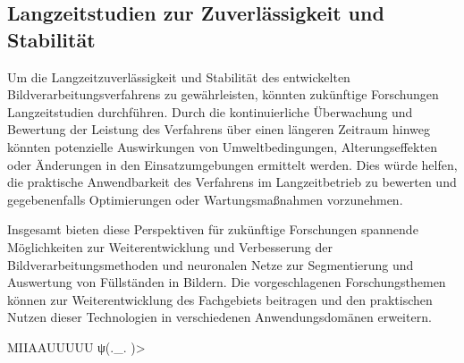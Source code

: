 \subsection{Langzeitstudien zur Zuverlässigkeit und Stabilität}

Um die Langzeitzuverlässigkeit und Stabilität des entwickelten Bildverarbeitungsverfahrens zu gewährleisten, könnten zukünftige Forschungen Langzeitstudien durchführen. Durch die kontinuierliche Überwachung und Bewertung der Leistung des Verfahrens über einen längeren Zeitraum hinweg könnten potenzielle Auswirkungen von Umweltbedingungen, Alterungseffekten oder Änderungen in den Einsatzumgebungen ermittelt werden. Dies würde helfen, die praktische Anwendbarkeit des Verfahrens im Langzeitbetrieb zu bewerten und gegebenenfalls Optimierungen oder Wartungsmaßnahmen vorzunehmen.

Insgesamt bieten diese Perspektiven für zukünftige Forschungen spannende Möglichkeiten zur Weiterentwicklung und Verbesserung der Bildverarbeitungsmethoden und neuronalen Netze zur Segmentierung und Auswertung von Füllständen in Bildern. Die vorgeschlagenen Forschungsthemen können zur Weiterentwicklung des Fachgebiets beitragen und den praktischen Nutzen dieser Technologien in verschiedenen Anwendungsdomänen erweitern.

MIIAAUUUUU
ψ(._. )>
